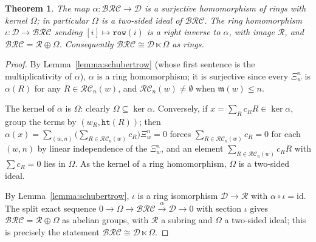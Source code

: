 \documentclass{amsart}
\newtheorem{theorem}{Theorem}[section]
\theoremstyle{definition}
\theoremstyle{remark}
\numberwithin{equation}{subsection}
\newcommand{\R}{\mathbf{R}}  %
\newcommand{\wof}[1]{w_{#1}}
\newcommand{\trm}{\mathtt{trim}}
\newcommand{\hr}{\mathtt{ht}}
\newcommand{\clp}{\mathtt{clip}}
\newcommand{\BRC}{\mathcal{BRC}}
\newcommand{\RC}{\mathcal{RC}}
\newcommand{\dsch}{\ensuremath{\Xi}}
\newcommand{\dcoma}{\mathcal{D}}
\newcommand{\maxd}{\mathfrak{m}}
\begin{document}
\begin{theorem} \label{theorem:semidirect}
  The map $\alpha:\BRC\to \dcoma$ is a surjective homomorphism of rings with kernel $\Omega$; in particular $\Omega$ is a two-sided ideal of $\BRC$. The ring homomorphism $\iota:\dcoma\to\BRC$ sending $[i]\mapsto \mathtt{row}(i)$ is a right inverse to $\alpha$, with image $\mathcal{R}$, and $\BRC=\mathcal{R}\oplus\Omega$. Consequently $\BRC\cong \dcoma\ltimes \Omega$ as rings.
\end{theorem}
\begin{proof}
By Lemma~\ref{lemma:schubertrow} (whose first sentence is the multiplicativity of $\alpha$), $\alpha$ is a ring homomorphism; it is surjective since every $\dsch_w^n$ is $\alpha(R)$ for any $R\in\RC_n(w)$, and $\RC_n(w)\neq\emptyset$ when $\maxd(w)\leq n$.

The kernel of $\alpha$ is $\Omega$: clearly $\Omega\subseteq\ker\alpha$. Conversely, if $x=\sum_R c_RR\in\ker\alpha$, group the terms by $(\wof{R},\hr(R))$; then $\alpha(x)=\sum_{(w,n)}\bigl(\sum_{R\in\RC_n(w)}c_R\bigr)\dsch_w^n=0$ forces $\sum_{R\in\RC_n(w)}c_R=0$ for each $(w,n)$ by linear independence of the $\dsch_w^n$, and an element $\sum_{R\in\RC_n(w)}c_RR$ with $\sum c_R=0$ lies in $\Omega$. As the kernel of a ring homomorphism, $\Omega$ is a two-sided ideal.

By Lemma~\ref{lemma:schubertrow}, $\iota$ is a ring isomorphism $\dcoma\to\mathcal{R}$ with $\alpha\circ\iota=\mathrm{id}$. The split exact sequence $0\to\Omega\to\BRC\xrightarrow{\alpha}\dcoma\to0$ with section $\iota$ gives $\BRC=\mathcal{R}\oplus\Omega$ as abelian groups, with $\mathcal{R}$ a subring and $\Omega$ a two-sided ideal; this is precisely the statement $\BRC\cong\dcoma\ltimes\Omega$.
\end{proof}




\end{document}
